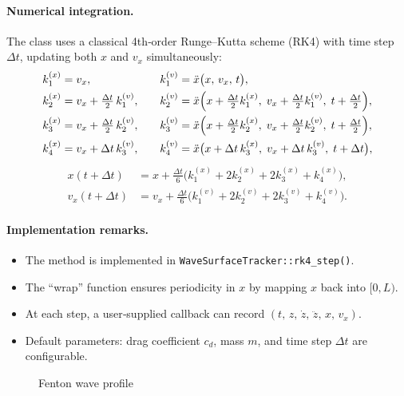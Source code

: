 \documentclass[11pt,letterpaper]{article}
\begin{document}
\paragraph{Numerical integration.}  
The class uses a classical 4th‐order Runge–Kutta scheme (RK4) with time step \(\Delta t\), updating both \(x\) and \(v_x\) simultaneously:
\[
\begin{aligned}
  k_{1}^{(x)} &= v_x, 
  &\quad
  k_{1}^{(v)} &= \ddot x\bigl(x,\,v_x,\,t\bigr),\\
  k_{2}^{(x)} &= v_x + \tfrac{\Delta t}{2}\,k_{1}^{(v)}, 
  &\quad
  k_{2}^{(v)} &= \ddot x\Bigl(x + \tfrac{\Delta t}{2}k_{1}^{(x)},\;v_x + \tfrac{\Delta t}{2}k_{1}^{(v)},\;t+\tfrac{\Delta t}{2}\Bigr),\\
  k_{3}^{(x)} &= v_x + \tfrac{\Delta t}{2}\,k_{2}^{(v)}, 
  &\quad
  k_{3}^{(v)} &= \ddot x\Bigl(x + \tfrac{\Delta t}{2}k_{2}^{(x)},\;v_x + \tfrac{\Delta t}{2}k_{2}^{(v)},\;t+\tfrac{\Delta t}{2}\Bigr),\\
  k_{4}^{(x)} &= v_x + \Delta t\,k_{3}^{(v)}, 
  &\quad
  k_{4}^{(v)} &= \ddot x\bigl(x + \Delta t\,k_{3}^{(x)},\;v_x + \Delta t\,k_{3}^{(v)},\;t+\Delta t\bigr),
\end{aligned}
\]
\[
\begin{aligned}
  x(t+\Delta t) &= x + \tfrac{\Delta t}{6}\bigl(k_{1}^{(x)} + 2k_{2}^{(x)} + 2k_{3}^{(x)} + k_{4}^{(x)}\bigr),\\
  v_x(t+\Delta t) &= v_x + \tfrac{\Delta t}{6}\bigl(k_{1}^{(v)} + 2k_{2}^{(v)} + 2k_{3}^{(v)} + k_{4}^{(v)}\bigr).
\end{aligned}
\]

\paragraph{Implementation remarks.}
\begin{itemize}
  \item The method is implemented in \texttt{WaveSurfaceTracker::rk4\_step()}.
  \item The “wrap” function ensures periodicity in \(x\) by mapping \(x\) back into \([0,L)\).
  \item At each step, a user‐supplied callback can record \((t,\,z,\,\dot z,\,\ddot z,\,x,\,v_x)\).
  \item Default parameters: drag coefficient \(c_d\), mass \(m\), and time step \(\Delta t\) are configurable.
\end{itemize}

\begin{figure}[h]
    \centering
    \resizebox{\textwidth}{!}{}
    \caption{Fenton wave profile}
    \label{fig:waveProfile}
\end{figure}
\end{document}
